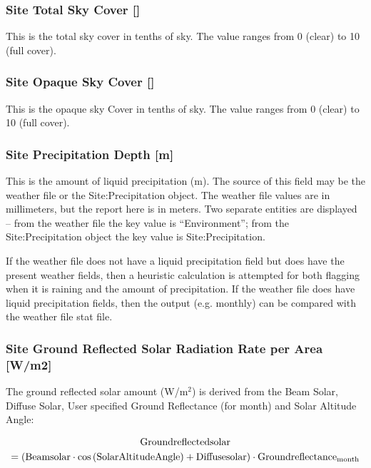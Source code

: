 \subsubsection{Site Total Sky Cover {[]}}\label{site-total-sky-cover}

This is the total sky cover in tenths of sky. The value ranges from 0 (clear) to 10 (full cover). 

\subsubsection{Site Opaque Sky Cover {[]}}\label{site-opaque-sky-cover}

This is the opaque sky Cover in tenths of sky. The value ranges from 0 (clear) to 10 (full cover). 

\subsubsection{Site Precipitation Depth {[}m{]}}\label{site-precipitation-depth-m}

This is the amount of liquid precipitation (m). The source of this field may be the weather file or the Site:Precipitation object. The weather file values are in millimeters, but the report here is in meters. Two separate entities are displayed -- from the weather file the key value is ``Environment''; from the Site:Precipitation object the key value is Site:Precipitation.

If the weather file does not have a liquid precipitation field but does have the present weather fields, then a heuristic calculation is attempted for both flagging when it is raining and the amount of precipitation. If the weather file does have liquid precipitation fields, then the output (e.g. monthly) can be compared with the weather file stat file.

\subsubsection{Site Ground Reflected Solar Radiation Rate per Area {[}W/m2{]}}\label{site-ground-reflected-solar-radiation-rate-per-area-wm2}

The ground reflected solar amount (W/m$^2$) is derived from the Beam Solar, Diffuse Solar, User specified Ground Reflectance (for month) and Solar Altitude Angle:

\begin{multline}
  \rm{Groundreflectedsolar}
  \\
  = \left( \rm{Beamsolar} \cdot cos \left( \rm{SolarAltitudeAngle} \right) + \rm{Diffusesolar} \right) \cdot \rm{Groundreflectance}_{\rm{month}}
\end{multline}

